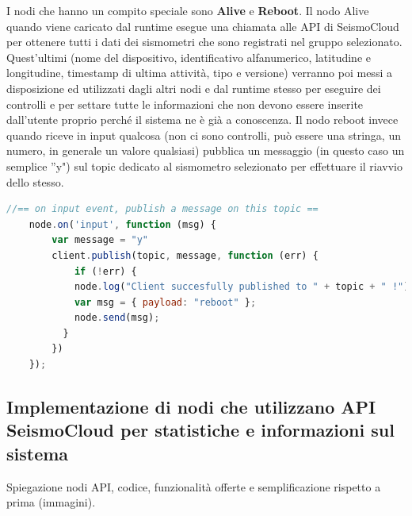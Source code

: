 \documentclass[a4paper,10pt]{memoir}
\begin{document}
I nodi che hanno un compito speciale sono \textbf{Alive} e \textbf{Reboot}.
Il nodo Alive quando viene caricato dal runtime esegue una chiamata alle API di SeismoCloud per ottenere tutti i dati dei sismometri che sono registrati nel gruppo selezionato. Quest'ultimi (nome del dispositivo, identificativo alfanumerico, latitudine e longitudine, timestamp di ultima attività, tipo e versione) verranno poi messi a disposizione ed utilizzati dagli altri nodi e dal runtime stesso per eseguire dei controlli e per settare tutte le informazioni che non devono essere inserite dall'utente proprio perché il sistema ne è già a conoscenza.
Il nodo reboot invece quando riceve in input qualcosa (non ci sono controlli, può essere una stringa, un numero, in generale un valore qualsiasi) pubblica un messaggio (in questo caso un semplice ''y") sul topic dedicato al sismometro selezionato per effettuare il riavvio dello stesso.
\begin{lstlisting}[language=Javascript, firstnumber=80]
    //== on input event, publish a message on this topic ==
    node.on('input', function (msg) {
        var message = "y"
        client.publish(topic, message, function (err) {
            if (!err) {
            node.log("Client succesfully published to " + topic + " !");
            var msg = { payload: "reboot" };
            node.send(msg);
          }
        })
    });
\end{lstlisting}

\subsection{Implementazione di nodi che utilizzano API SeismoCloud per statistiche e informazioni sul sistema}

Spiegazione nodi API, codice, funzionalità offerte e semplificazione rispetto a prima (immagini).
\end{document}
